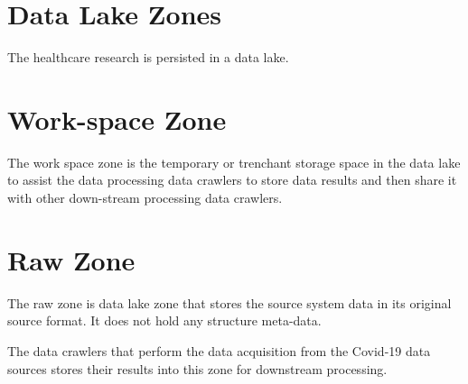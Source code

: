 \section{Data Lake Zones}

The healthcare research is persisted in a data lake.

\section{Work-space Zone}

The work space zone is the temporary or trenchant storage space in the data lake to assist the data processing data crawlers to store data results and then share it with other down-stream processing data crawlers.

\section{Raw Zone}

The raw zone is data lake zone that stores the source system data in its original source format. It does not hold any structure meta-data.

The data crawlers that perform the data acquisition from the Covid-19 data sources stores their results into this zone for downstream processing.



